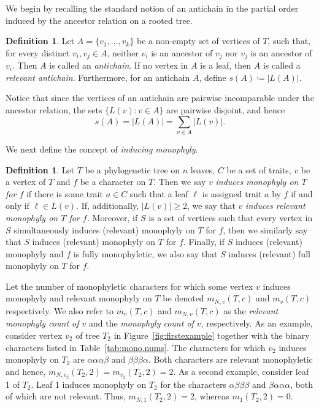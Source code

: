 \documentclass{amsart}
\theoremstyle{definition}
\newtheorem{definition}[theorem]{Definition}
\begin{document}
We begin by recalling the standard notion of an antichain in the partial order induced by the ancestor relation on a rooted tree. 

\begin{definition}
    Let $A=\{v_1,\dots,v_k\}$ be a non-empty set of vertices of $T$, such  that, for every distinct $v_i,v_j\in A$, neither $v_i$ is an ancestor of $v_j$ nor $v_j$ is an ancestor of $v_i$.
    Then $A$ is called an \emph{antichain}. If no vertex in $A$ is a leaf, then $A$ is called a \emph{relevant antichain}.
    Furthermore, for an antichain $A$, define $s(A) \coloneqq \vert L(A) \vert$.
\end{definition}


Notice that since the vertices of an antichain are pairwise incomparable under the ancestor relation, the sets $\{L(v):v\in A\}$ are pairwise disjoint, and hence
\[s(A)=|L(A)|=\sum_{v\in A}|L(v)|.\]

We next define the concept of \emph{inducing monophyly}.
\begin{definition}
    Let $T$ be a phylogenetic tree on $n$ leaves, $C$ be a set of traits, $v$ be a vertex of $T$ and $f$ be a character on $T$. Then we say $v$ \emph{induces monophyly on $T$ for $f$} if there is some trait $a \in C$ such that a leaf $\ell$ is assigned trait $a$ by $f$ if and only if $\ell \in L(v)$. If, additionally, $|L(v)| \geq 2$, we say that $v$ \emph{induces relevant monophyly on $T$ for $f$.} Moreover, if $S$ is a set of vertices such that every vertex in $S$ simultaneously induces (relevant) monophyly on $T$ for $f$, then we similarly say that $S$ induces (relevant) monophyly on $T$ for $f$. Finally, if $S$ induces (relevant) monophyly and $f$ is fully monophyletic, we also say that $S$ induces (relevant) full monophyly on $T$ for $f$.
\end{definition}

Let the number of monophyletic characters for which some vertex $v$ induces monophyly and relevant monophyly on $T$ be denoted $m_{N,v}(T,c)$ and $m_v(T,c)$ respectively. We also refer to $m_v(T,c)$ and $m_{N,v}(T,c)$ as the \emph{relevant monophyly count of $v$} and the \emph{monophyly count of $v$}, respectively. As an example, consider vertex $v_2$ of tree $T_2$ in Figure~\ref{fig:firstexample} together with the binary characters listed in Table~\ref{tab:mono.nums}. The characters for which $v_2$ induces monophyly on $T_2$ are $\alpha \alpha \alpha \beta$ and $\beta \beta \beta \alpha$. Both characters are relevant monophyletic and hence, $m_{N,v_2}(T_2,2)=m_{v_2}(T_2,2)=2$. As a second example, consider leaf 1 of $T_2$. Leaf 1 induces monophyly on $T_2$ for the characters $\alpha \beta \beta \beta$ and $\beta \alpha \alpha \alpha$, both of which are not relevant. Thus, $m_{N,1}(T_2,2)=2$, whereas $m_{1}(T_2,2)=0$.
\end{document}
